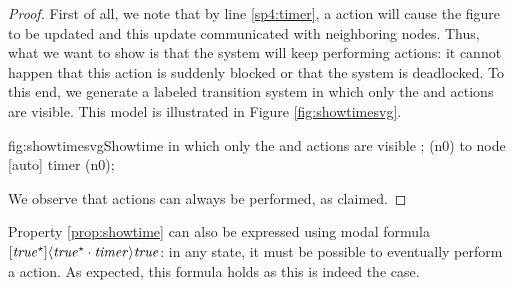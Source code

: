 \begin{proof}
First of all, we note that by line \ref{sp4:timer}, a  action will cause the figure to be updated and this update communicated with neighboring nodes. Thus, what we want to show is that the system will keep performing  actions: it cannot happen that this action is suddenly blocked or that the system is deadlocked. To this end, we generate a labeled transition system in which only the  and  actions are visible. This model is illustrated in Figure \ref{fig:showtimesvg}.

\begin{statespace}{fig:showtimesvg}{Showtime in which only the  and  actions are visible}
 ;
  (n0) to node [auto] {timer} (n0);
\end{statespace}

We observe that  actions can always be performed, as claimed.
\end{proof}

Property \ref{prop:showtime} can also be expressed using modal formula $[{\it true}^{\star} ] \langle {\it true}^{\star} \cdot {\it timer} \rangle {\it true}$: in any state, it must be possible to eventually perform a  action. As expected, this formula holds as this is indeed the case.
